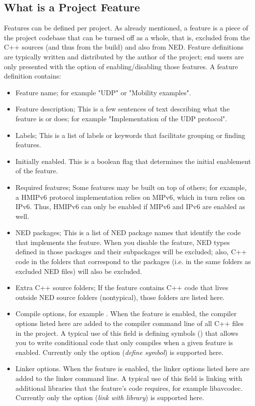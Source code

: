 \subsection{What is a Project Feature}
\label{sec:build-sim-progs:project-feature}

Features can be defined per project. As already mentioned, a feature is a piece of the
project codebase that can be turned off as a whole, that is, excluded from the C++ sources
(and thus from the build) and also from NED. Feature definitions are typically written
and distributed by the author of the project; end users are only presented with the
option of enabling/disabling those features. A feature definition contains:

\begin{itemize}
  \item{Feature name; for example "UDP" or "Mobility examples".}
  \item{Feature description; This is a few sentences of text describing what the feature
    is or does; for example "Implementation of the UDP protocol".}
  \item{Labels; This is a list of labels or keywords that facilitate grouping or finding features.}
  \item{Initially enabled. This is a boolean flag that determines the initial enablement
    of the feature.}
\item{Required features; Some features may be built on top of others; for example, a HMIPv6
    protocol implementation relies on MIPv6, which in turn relies on IPv6. Thus, HMIPv6 can
    only be enabled if MIPv6 and IPv6 are enabled as well.}
\item{NED packages; This is a list of NED package names that identify the code that implements
    the feature. When you disable the feature, NED types defined in those packages and their
    subpackages will be excluded; also, C++ code in the folders that correspond to the packages
    (i.e. in the same folders as excluded NED files) will also be excluded.}
\item{Extra C++ source folders; If the feature contains C++ code that lives outside NED source
    folders (nontypical), those folders are listed here.}
\item{Compile options, for example . When the feature is enabled, the compiler
    options listed here are added to the compiler command line of all C++ files in the project.
    A typical use of this field is defining symbols () that allows you to write conditional code
    that only compiles when a given feature is enabled. Currently only the  option
    (\textit{define symbol}) is supported here.}
\item{Linker options. When the feature is enabled, the linker options listed here are added
    to the linker command line. A typical use of this field is linking with additional
    libraries that the feature's code requires, for example libavcodec.
    Currently only the  option (\textit{link with library}) is supported here.}
\end{itemize}

